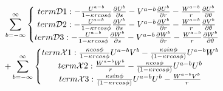 \documentclass{Note}
\begin{document}
\begin{equation}
\begin{aligned}
\\\sum_{b=-\infty}^{\infty}
\left\{\begin{matrix}
term\mathcal{D}1: -{U^{a-b}\over {1-\kappa r cos\phi}}  {{\partial U^b} \over {\partial s}}-V^{a-b}{{\partial U^b}\over{\partial r}}-{W^{a-b}\over r}{{\partial U^b}\over {\partial \theta}}\\
term\mathcal{D}2: -{U^{a-b}\over {1-\kappa r cos\phi}}  {{\partial V^b} \over {\partial s}}-V^{a-b}{{\partial V^b}\over{\partial r}}-{W^{a-b}\over r}{{\partial V^b}\over {\partial \theta}}\\
term\mathcal{D}3: -{U^{a-b}\over {1-\kappa r cos\phi}}  {{\partial W^b} \over {\partial s}}-V^{a-b}{{\partial W^b}\over{\partial r}}-{W^{a-b}\over r}{{\partial W^b}\over {\partial \theta}}\\
\end{matrix}\right.\\
+\sum_{b=-\infty}^{\infty}\left\{\begin{matrix}
term\mathcal{X}1: {\kappa cos\phi \over{1-\kappa rcos\phi}}U^{a-b}V^b-{\kappa sin\phi \over{(1-\kappa r cos\phi)}}U^{a-b}W^b\\
term\mathcal{X}2: {W^{a-b}W^b\over{r}}-{\kappa cos\phi \over{(1-\kappa r cos\phi)}}U^{a-b}U^b\\
term\mathcal{X}3: {\kappa sin\phi \over{(1-\kappa r cos\phi)}}U^{a-b}U^b-{W^{a-b}V^b\over{r}}\\
\end{matrix}\right.
\end{aligned}
\end{equation}
\end{document}
